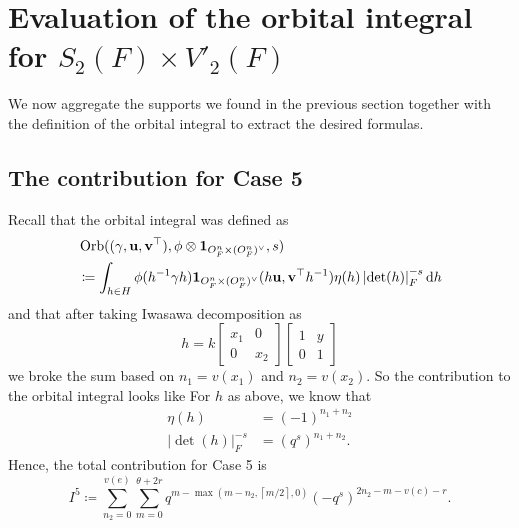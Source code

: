 \chapter{Evaluation of the orbital integral for $S_2(F) \times V'_2(F)$}
\label{ch:orbitalFJ2}

We now aggregate the supports we found in the previous section together with the
definition of the orbital integral to extract the desired formulas.

\section{The contribution for Case 5}
Recall that the orbital integral was defined as
\begin{align*}
  & \Orb(\guv, \phi \otimes \oneV, s) \\
  &\coloneqq
  \int_{h \in H} \phi(h\inv \gamma h)
  \oneV(h \uu, \vv^\top h^{-1})
  \eta(h) \left\lvert \det(h) \right\rvert_F^{-s} \odif h
\end{align*}
and that after taking Iwasawa decomposition as
\[ h = k \begin{bmatrix} x_1 & 0 \\ 0 & x_2 \end{bmatrix}
  \begin{bmatrix} 1 & y \\ 0 & 1 \end{bmatrix} \]
we broke the sum based on $n_1 = v(x_1)$ and $n_2 = v(x_2)$.
So the contribution to the orbital integral looks like
For $h$ as above, we know that
\begin{align*}
  \eta(h) &= (-1)^{n_1 + n_2} \\
  \left\lvert \det(h) \right\rvert_F^{-s} &= (q^s)^{n_1 + n_2}.
\end{align*}
Hence, the total contribution for Case 5 is
\[
  I^{\text{5}} \coloneqq \sum_{n_2 = 0}^{v(e)} \sum_{m = 0}^{\theta + 2r}
  q^{m - \max\left( m-n_2, \left\lceil m/2 \right\rceil, 0 \right)}
  (-q^s)^{2n_2 - m - v(c) - r}.
\]

